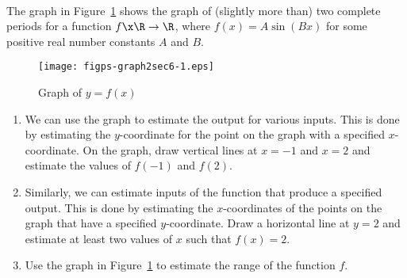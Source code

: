 \begin{prog} \label{pr:graphreal} \hfill \\ 
The graph in Figure~\ref{fig:functiongraph2} shows the graph of (slightly more than) two complete periods for a function $f \x \R \to \R$, where $f(x) = A \sin (Bx)$ for some positive real number constants $A$ and $B$.
\begin{figure}[h]
\begin{center}
\texttt{[image: figps-graph2sec6-1.eps]} 
\caption{Graph of $y = f( x )$} \label{fig:functiongraph2}
\end{center}
\end{figure}
\begin{enumerate}
  \item We can use the graph to estimate the output for various inputs.  This is done by estimating the $y$-coordinate for the point on the graph with a specified $x$-coordinate.  On the graph, draw vertical lines at  $x =  - 1$  and  $x = 2$ and estimate the values of  $f( { - 1} )$  and  $f( 2 )$.
  \item Similarly, we can estimate inputs of the function that produce a specified output.  This is done by estimating the $x$-coordinates of the points on the graph that have a specified 
$y$-coordinate.  Draw a horizontal line at  $y = 2$ and estimate at least two values of  $x$  such that  
$f( x ) = 2$.
  \item Use the graph in Figure~\ref{fig:functiongraph2} to estimate the range of the function $f$.
\end{enumerate}
\end{prog}
\hbreak


\endinput

